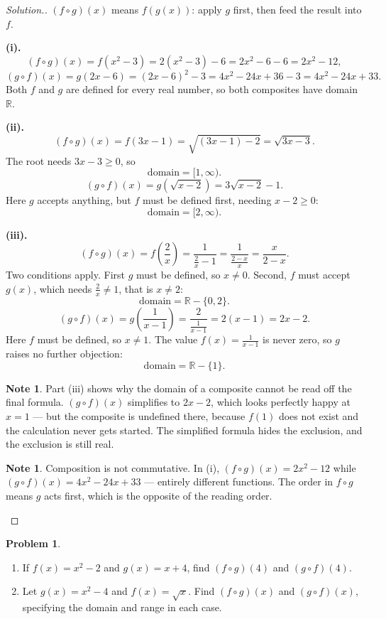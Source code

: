\documentclass[11pt,a4paper]{article}
\theoremstyle{definition}
\newtheorem{note}[thm]{Note}
\newtheorem{problemx}{Problem}[section]
\newenvironment{problem}{\begin{problemx}}{\end{problemx}}
\newenvironment{solution}
  {\renewcommand{\qedsymbol}{}\begin{proof}[\textit{Solution}.]}
  {\end{proof}}
\begin{document}
\begin{solution}
$(f\circ g)(x)$ means $f\left(g(x)\right)$: apply $g$ first, then feed the result into
$f$.

\textbf{(i).}
$$(f\circ g)(x)=f\left(x^2-3\right)=2\left(x^2-3\right)-6=2x^2-6-6=2x^2-12,$$
$$(g\circ f)(x)=g(2x-6)=(2x-6)^2-3=4x^2-24x+36-3=4x^2-24x+33.$$
Both $f$ and $g$ are defined for every real number, so both composites have domain
$\mathbb{R}$.

\textbf{(ii).}
$$(f\circ g)(x)=f(3x-1)=\sqrt{(3x-1)-2}=\sqrt{3x-3}.$$
The root needs $3x-3\geq 0$, so
$$\text{domain}=[1,\infty).$$
$$(g\circ f)(x)=g\left(\sqrt{x-2}\right)=3\sqrt{x-2}-1.$$
Here $g$ accepts anything, but $f$ must be defined first, needing $x-2\geq 0$:
$$\text{domain}=[2,\infty).$$

\textbf{(iii).}
$$(f\circ g)(x)=f\left(\frac{2}{x}\right)=\frac{1}{\frac{2}{x}-1}
=\frac{1}{\frac{2-x}{x}}=\frac{x}{2-x}.$$
Two conditions apply. First $g$ must be defined, so $x\neq 0$. Second, $f$ must accept
$g(x)$, which needs $\frac{2}{x}\neq 1$, that is $x\neq 2$:
$$\text{domain}=\mathbb{R}-\{0,2\}.$$
$$(g\circ f)(x)=g\left(\frac{1}{x-1}\right)=\frac{2}{\frac{1}{x-1}}=2(x-1)=2x-2.$$
Here $f$ must be defined, so $x\neq 1$. The value $f(x)=\frac{1}{x-1}$ is never zero, so
$g$ raises no further objection:
$$\text{domain}=\mathbb{R}-\{1\}.$$

\begin{note}
Part (iii) shows why the domain of a composite cannot be read off the final formula.
$(g\circ f)(x)$ simplifies to $2x-2$, which looks perfectly happy at $x=1$ --- but the
composite is undefined there, because $f(1)$ does not exist and the calculation never
gets started. The simplified formula hides the exclusion, and the exclusion is still
real.
\end{note}

\begin{note}
Composition is not commutative. In (i), $(f\circ g)(x)=2x^2-12$ while
$(g\circ f)(x)=4x^2-24x+33$ --- entirely different functions. The order in $f\circ g$
means $g$ acts first, which is the opposite of the reading order.
\end{note}
\end{solution}

\begin{problem}
\begin{enumerate}
\item[(a).] If $f(x)=x^2-2$ and $g(x)=x+4$, find $(f\circ g)(4)$ and $(g\circ f)(4)$.
\item[(b).] Let $g(x)=x^2-4$ and $f(x)=\sqrt{x}$. Find $(f\circ g)(x)$ and
$(g\circ f)(x)$, specifying the domain and range in each case.
\end{enumerate}
\end{problem}
\end{document}
